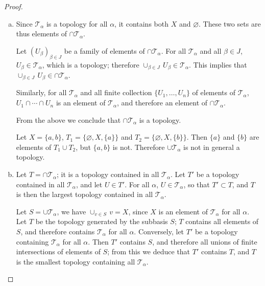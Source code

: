\documentclass[11pt,a4paper,twoside]{article}
\theoremstyle{definition}
\begin{document}
\begin{proof} \hspace{0pt} \\

  \begin{enumerate}[(a)]

  \item Since $\mathscr{T}_\alpha$ is a topology for all $\alpha$, it contains both $X$ and $\varnothing$.
    These two sets are thus elements of $\cap \mathscr{T}_\alpha$.

    Let $( U_\beta )_{\beta \in J}$ be a family of elements of $\cap \mathscr{T}_\alpha$.
    For all $\mathscr{T}_\alpha$ and all $\beta \in J$, $U_\beta \in \mathscr{T}_\alpha$,
    which is a topology; therefore $\cup_{\beta \in J} \,U_\beta \in \mathscr{T}_\alpha$.
    This implies that $\cup_{\beta \in J} \,U_\beta \in \cap \mathscr{T}_\alpha$.

    Similarly, for all $\mathscr{T}_\alpha$ and all finite collection $\{ U_1, \dotsc, U_n \}$
    of elements of $\mathscr{T}_\alpha$, $U_1 \cap \dotsb \cap U_n$ is an element of $\mathscr{T}_\alpha$,
    and therefore an element of $\cap \mathscr{T}_\alpha$.

    From the above we conclude that $\cap \mathscr{T}_\alpha$ is a topology.

    Let $X = \{ a, b \}$, $T_1 = \big\{ \varnothing, X, \{ a \} \big\}$ and
    $T_2 = \{ \varnothing, X, \{ b \} \}$. Then $\{ a \}$ and $\{ b \}$ are
    elements of $T_1 \cup T_2$, but $\{ a, b \}$ is not. Therefore $\cup \mathscr{T}_\alpha$
    is not in general a topology.

  \item Let $T = \cap \mathscr{T}_\alpha$; it is a topology contained in all $\mathscr{T}_\alpha$.
    Let $T'$ be a topology contained in all $\mathscr{T}_\alpha$, and let $U \in T'$. For all $\alpha$,
    $U \in \mathscr{T}_\alpha$, so that $T' \subset T$, and $T$ is then the largest topology contained
    in all $\mathscr{T}_\alpha$.

    Let $S = \cup \mathscr{T}_\alpha$, we have $\cup_{v \in S} \,v = X$, since $X$ is an element of
    $\mathscr{T}_\alpha$ for all $\alpha$. Let $T$ be the topology generated by the subbasis $S$;
    $T$ contains all elements of $S$, and therefore contains $\mathscr{T}_\alpha$ for all $\alpha$.
    Conversely, let $T'$ be a topology containing $\mathscr{T}_\alpha$ for all $\alpha$. Then $T'$
    contains $S$, and therefore all unions of finite intersections of elements of $S$; from this
    we deduce that $T'$ contains $T$, and $T$ is the smallest topology containing all $\mathscr{T}_\alpha$.


\end{enumerate}
\end{proof}
\end{document}
